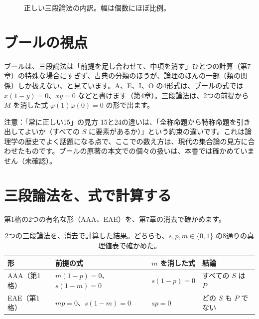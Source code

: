 \documentclass[a4paper,11pt,openany]{ltjsbook}
\begin{document}
\begin{figure}[htbp]
\centering
{}
\caption{正しい三段論法の内訳。幅は個数にほぼ比例。}
\end{figure}

\section{ブールの視点}

ブールは、三段論法は「前提を足し合わせて、中項を消す」ひとつの計算（第7章）の特殊な場合にすぎず、古典の分類のほうが、論理のほんの一部（類の関係）しか扱えない、と見ています。A、E、I、O の4形式は、ブールの式では $x(1-y)=0$、$xy=0$ などと書けます（第4章）。三段論法は、2つの前提から $M$ を消した式 $\varphi(1)\varphi(0)=0$ の形で出ます。

\begin{notebox}{注意：「常に正しい15」の見方}
15と24の違いは、「全称命題から特称命題を引き出してよいか（すべての $S$ に要素があるか）」という約束の違いです。これは論理学の歴史でよく話題になる点で、ここでの数え方は、現代の集合論の見方に合わせたものです。ブールの原著の本文での個々の扱いは、本書では確かめていません（未確認）。
\end{notebox}

\section{三段論法を、式で計算する}

第1格の2つの有名な形（AAA、EAE）を、第7章の消去で確かめます。

\begin{table}[htbp]
\centering
\begin{tabular}{llll}
\toprule
形 & 前提の式 & $m$ を消した式 & 結論\\
\midrule
AAA（第1格） & $m(1-p)=0$、$s(1-m)=0$ & $s(1-p)=0$ & すべての $S$ は $P$\\
EAE（第1格） & $mp=0$、$s(1-m)=0$ & $sp=0$ & どの $S$ も $P$ でない\\
\bottomrule
\end{tabular}
\caption{2つの三段論法を、消去で計算した結果。どちらも、$s,p,m\in\{0,1\}$ の8通りの真理値表で確かめた。}
\end{table}
\end{document}
